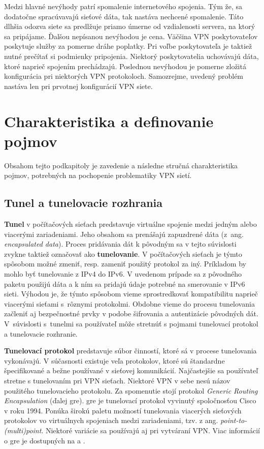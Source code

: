 Medzi hlavné nevýhody patrí spomalenie internetového spojenia. Tým že, sa dodatočne spracúvavajú sieťové dáta, tak nastáva nechcené spomalenie. Táto dlhšia odozva siete sa predlžuje priamo úmerne od vzdialenosti servera, na ktorý sa pripájame. Ďalšou nepísanou nevýhodou je cena. Väčšina VPN poskytovateľov poskytuje služby za pomerne dráhe poplatky. Pri voľbe poskytovateľa je taktiež nutné prečítať si podmienky pripojenia. Niektorý poskytovatelia uchovávajú dáta, ktoré naprieč spojením prechádzajú. Poslednou nevýhodou je pomerne zložitá konfigurácia pri niektorých VPN protokoloch. Samozrejme, uvedený problém nastáva len pri prvotnej konfigurácií VPN siete.   

\section{Charakteristika a definovanie pojmov}
Obsahom tejto podkapitoly je zavedenie a následne stručná charakteristika pojmov, potrebných na pochopenie problematiky VPN sietí.
\subsection{Tunel a tunelovacie rozhrania}
\textbf{Tunel} v počítačových sieťach predstavuje virtuálne spojenie medzi jedným alebo viacerými zariadeniami. Jeho obsahom sa prenášajú zapuzdrené dáta (z~ang. \textit{encapsulated data}). Proces pridávania dát k pôvodným sa v tejto súvislosti zvykne taktiež označovať ako \textbf{tunelovanie}. V počítačových sieťach je týmto spôsobom možné zmeniť, resp. zameniť použitý protokol za iný. Príkladom by mohlo byť tunelovanie z IPv4 do IPv6. V uvedenom prípade sa z pôvodného paketu použijú dáta a k ním sa pridajú údaje potrebné na smerovanie v IPv6 sieti. Výhodou je, že týmto spôsobom vieme sprostredkovať kompatibilitu naprieč viacerými sieťami s~rôznymi protokolmi. Obdobne vieme do procesu tunelovania začleniť aj bezpečnostné prvky v podobe šifrovania a autentizácie pôvodných dát. V~súvislosti s~tunelmi sa používateľ môže stretnúť s pojmami tunelovací protokol a tunelovacie rozhranie. 

\textbf{Tunelovací protokol} predstavuje súbor činností, ktoré sá v procese tunelovania vykonávajú. V súčasnosti existuje veľa protokolov, ktoré sú štandardne špecifikované a bežne používané v sieťovej komunikácií. Najčastejšie sa používateľ stretne s tunelovaním pri VPN sieťach. Niektoré VPN v sebe nesú názov použitého tunelovacieho protokolu. Za spomenutie stojí protokol \textit{Generic Routing Encapsulation} (ďalej \acrshort{gre}). \acrshort{gre} je tunelovací protokol vyvinutý spoločnosťou Cisco v roku 1994. Ponúka širokú paletu možností tunelovania viacerých sieťových protokolov vo virtuálnych spojeniach medzi zariadeniami, tzv. z ang. \textit{point-to-(multi)point}. Niektoré variácie sa používajú aj pri vytváraní VPN. Viac informácií o \acrshort{gre} je dostupných na \cite{gre} a \cite{rfc1701}. 

